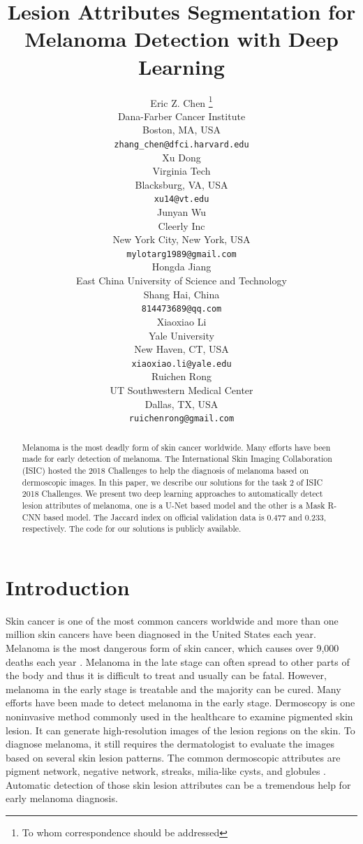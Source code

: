 \documentclass{article}
\title{Lesion Attributes Segmentation for Melanoma Detection with Deep Learning}
\author{
  Eric Z. Chen \thanks{To whom correspondence should be addressed}\\
  Dana-Farber Cancer Institute\\
  Boston, MA, USA \\
  \texttt{zhang\_chen@dfci.harvard.edu} \\
  \And
  Xu Dong \\
  Virginia Tech \\
  Blacksburg, VA, USA \\
  \texttt{xu14@vt.edu} \\
  \AND
  Junyan Wu \\
  Cleerly Inc \\
  New York City, New York, USA \\
  \texttt{mylotarg1989@gmail.com} \\
  \And
  Hongda Jiang \\
  East China University of Science and Technology \\
  Shang Hai, China \\
  \texttt{814473689@qq.com} \\
  \And
  Xiaoxiao Li \\
  Yale University \\
  New Haven, CT, USA \\
  \texttt{xiaoxiao.li@yale.edu} \\
  \And
  Ruichen Rong \\
  UT Southwestern Medical Center \\
  Dallas, TX, USA \\
  \texttt{ruichenrong@gmail.com} \\
}
\begin{document}


\maketitle

\begin{abstract}
Melanoma is the most deadly form of skin cancer worldwide. Many efforts have been made for early detection of melanoma. The International Skin Imaging Collaboration (ISIC) hosted the 2018 Challenges to help the diagnosis of melanoma based on dermoscopic images. In this paper, we describe our solutions for the task 2 of ISIC 2018 Challenges. We present two deep learning approaches to automatically detect lesion attributes of melanoma, one is a U-Net based model and the other is a Mask R-CNN based model. The Jaccard index on official validation data is 0.477 and 0.233, respectively. The code for our solutions is publicly available. 
\end{abstract}


\section{Introduction}



Skin cancer is one of the most common cancers worldwide and more than one million skin cancers have been diagnosed in the United States each year. Melanoma is the most dangerous form of skin cancer, which causes over 9,000 deaths each year \citep{ucsw2013united}. Melanoma in the late stage can often spread to other parts of the body and thus it is difficult to treat and usually can be fatal. However, melanoma in the early stage is treatable and the majority can be cured. Many efforts have been made to detect melanoma in the early stage. Dermoscopy is one noninvasive method commonly used in the healthcare to examine pigmented skin lesion. It can generate high-resolution images of the lesion regions on the skin. To diagnose melanoma, it still requires the dermatologist to evaluate the images based on several skin lesion patterns. The common dermoscopic attributes are pigment network, negative network, streaks, milia-like cysts, and globules \citep{mishra2016overview}. Automatic detection of those skin lesion attributes can be a tremendous help for early melanoma diagnosis. 
\end{document}
